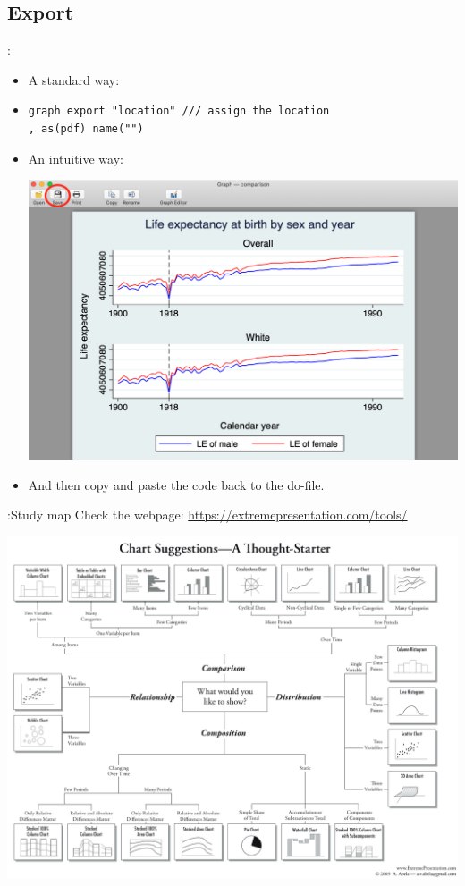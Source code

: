 \subsection{Export}
\begin{frame}[fragile]{\secname: \subsecname}
\begin{itemize}
	\item A standard way: 
	\item[] \begin{verbatim}
graph export "location" /// assign the location
, as(pdf) name("")	
 \end{verbatim}
	\item An intuitive way: \\
	\begin{center}
	\includegraphics[scale=0.15]{images/export}
\end{center}
\item And then copy and paste the code back to the do-file.
\end{itemize}

\end{frame}

\begin{frame}{\secname:Study map}
Check the webpage: \url{https://extremepresentation.com/tools/}
\vspace{-10pt}
\begin{center}
	\includegraphics[scale=0.35]{images/chart}
\end{center}

\end{frame}



